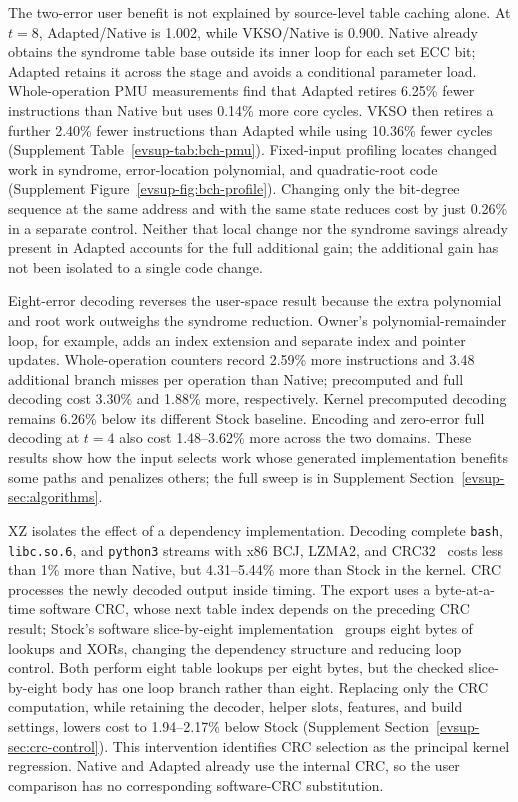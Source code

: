 The two-error user benefit is not explained by source-level table caching
alone. At $t=8$, Adapted/Native is 1.002, while VKSO/Native is 0.900.
Native already obtains the syndrome table base outside its inner loop
for each set ECC bit; Adapted retains it across the stage and avoids a
conditional parameter load. Whole-operation PMU measurements find that
Adapted retires 6.25\% fewer instructions than Native but uses 0.14\%
more core cycles. VKSO then retires a further 2.40\% fewer instructions
than Adapted while using 10.36\% fewer cycles
(Supplement Table~\ref{evsup-tab:bch-pmu}). Fixed-input profiling locates
changed work in syndrome, error-location polynomial, and quadratic-root
code (Supplement Figure~\ref{evsup-fig:bch-profile}). Changing only the
bit-degree sequence at the same address and with the same state reduces
cost by just 0.26\% in a separate control. Neither that local change nor
the syndrome savings already present in Adapted accounts for the full
additional gain; the additional gain has not been isolated to a single code change.

\FloatBarrier

Eight-error decoding reverses the user-space result because the extra
polynomial and root work outweighs the syndrome reduction. Owner's
polynomial-remainder loop, for example, adds an index extension and
separate index and pointer updates. Whole-operation counters record
2.59\% more instructions and 3.48 additional branch misses per operation
than Native; precomputed and full decoding cost 3.30\% and 1.88\%
more, respectively. Kernel precomputed decoding remains 6.26\% below
its different Stock baseline. Encoding and zero-error full decoding at
$t=4$ also cost 1.48--3.62\% more across the two domains. These results
show how the input selects work whose generated implementation benefits
some paths and penalizes others; the full sweep is in Supplement
Section~\ref{evsup-sec:algorithms}.

XZ isolates the effect of a dependency implementation. Decoding complete
\texttt{bash}, \texttt{libc.so.6}, and \texttt{python3} streams with
x86 BCJ, LZMA2, and CRC32~\cite{ev_linuxxz515} costs less than 1\% more
than Native, but 4.31--5.44\% more than Stock in the kernel. CRC processes
the newly decoded output inside timing. The export uses a byte-at-a-time
software CRC, whose next table index depends on the preceding CRC result;
Stock's software slice-by-eight implementation~\cite{ev_linuxcrc515}
groups eight bytes of lookups and XORs, changing the dependency structure
and reducing loop control. Both perform eight table lookups per eight
bytes, but the checked slice-by-eight body has one loop branch rather
than eight. Replacing only the CRC computation, while retaining the
decoder, helper slots, features, and build settings, lowers cost to
1.94--2.17\% below Stock (Supplement
Section~\ref{evsup-sec:crc-control}). This intervention identifies CRC
selection as the principal kernel regression. Native and Adapted already
use the internal CRC, so the user comparison has no corresponding
software-CRC substitution.

